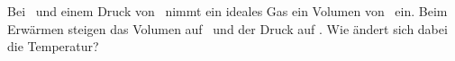 Bei \thEiO\ und einem Druck von \pEiO\ nimmt ein ideales Gas ein Volumen von \VEiO\ ein. Beim Erwärmen steigen das Volumen auf \VZwO\ und der Druck auf \pZwO. Wie ändert sich dabei die Temperatur?
